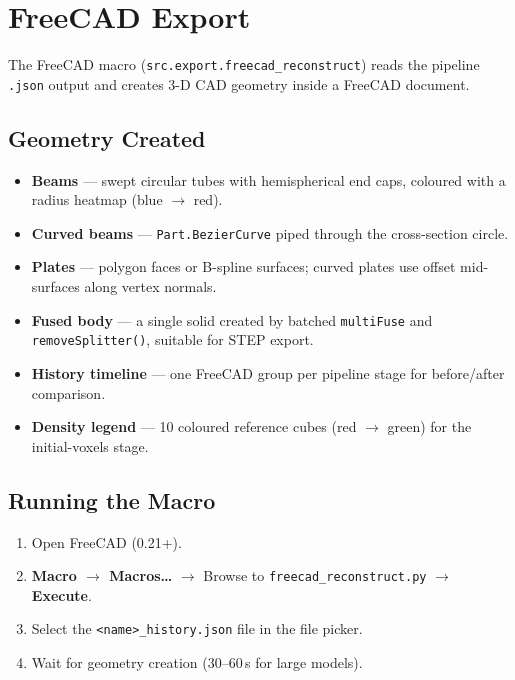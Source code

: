 \documentclass[a4paper, 11pt, openany]{report}
\begin{document}
\section{FreeCAD Export}
\label{sec:freecad-export}

The FreeCAD macro (\texttt{src.export.freecad\_reconstruct}) reads the pipeline
\texttt{.json} output and creates 3-D CAD geometry inside a FreeCAD document.

\subsection{Geometry Created}

\begin{itemize}[nosep]
    \item \textbf{Beams} --- swept circular tubes with hemispherical end caps,
          coloured with a radius heatmap (blue $\to$ red).
    \item \textbf{Curved beams} --- \texttt{Part.BezierCurve} piped through the
          cross-section circle.
    \item \textbf{Plates} --- polygon faces or B-spline surfaces; curved plates
          use offset mid-surfaces along vertex normals.
    \item \textbf{Fused body} --- a single solid created by batched
          \texttt{multiFuse} and \texttt{removeSplitter()}, suitable for STEP export.
    \item \textbf{History timeline} --- one FreeCAD group per pipeline stage for
          before/after comparison.
    \item \textbf{Density legend} --- 10 coloured reference cubes (red $\to$
          green) for the initial-voxels stage.
\end{itemize}

\subsection{Running the Macro}

\begin{enumerate}[nosep]
    \item Open FreeCAD (0.21+).
    \item \textbf{Macro $\to$ Macros\ldots} $\to$ Browse to
          \texttt{freecad\_reconstruct.py} $\to$ \textbf{Execute}.
    \item Select the \texttt{<name>\_history.json} file in the file picker.
    \item Wait for geometry creation (30--60\,s for large models).
\end{enumerate}
\end{document}
